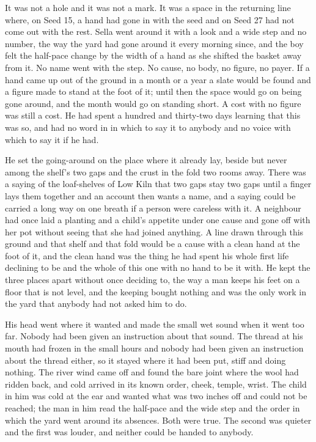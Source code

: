 It was not a hole and it was not a mark. It was a space in the returning line where, on Seed 15, a hand had gone in with the seed and on Seed 27 had not come out with the rest. Sella went around it with a look and a wide step and no number, the way the yard had gone around it every morning since, and the boy felt the half-pace change by the width of a hand as she shifted the basket away from it. No name went with the step. No cause, no body, no figure, no payer. If a hand came up out of the ground in a month or a year a slate would be found and a figure made to stand at the foot of it; until then the space would go on being gone around, and the month would go on standing short. A cost with no figure was still a cost. He had spent a hundred and thirty-two days learning that this was so, and had no word in  in which to say it to anybody and no voice with which to say it if he had.

He set the going-around on the place where it already lay, beside but never among the shelf's two gaps and the crust in the fold two rooms away. There was a saying of the loaf-shelves of Low Kiln that two gaps stay two gaps until a finger lays them together and an account then wants a name, and a saying could be carried a long way on one breath if a person were careless with it. A neighbour had once laid a planting and a child's appetite under one cause and gone off with her pot without seeing that she had joined anything. A line drawn through this ground and that shelf and that fold would be a cause with a clean hand at the foot of it, and the clean hand was the thing he had spent his whole first life declining to be and the whole of this one with no hand to be it with. He kept the three places apart without once deciding to, the way a man keeps his feet on a floor that is not level, and the keeping bought nothing and was the only work in the yard that anybody had not asked him to do.

His head went where it wanted and made the small wet sound when it went too far. Nobody had been given an instruction about that sound. The thread at his mouth had frozen in the small hours and nobody had been given an instruction about the thread either, so it stayed where it had been put, stiff and doing nothing. The river wind came off  and found the bare joint where the wool had ridden back, and cold arrived in its known order, cheek, temple, wrist. The child in him was cold at the ear and wanted what was two inches off and could not be reached; the man in him read the half-pace and the wide step and the order in which the yard went around its absences. Both were true. The second was quieter and the first was louder, and neither could be handed to anybody.

